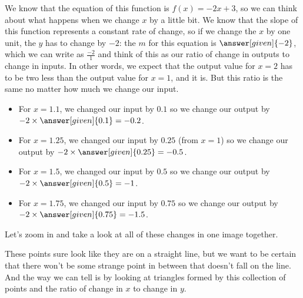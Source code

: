 \documentclass{ximera}
\begin{document}
\begin{example}
We know that the equation of this function is $f(x) = -2x+3$, so we can think about what happens when we change $x$ by a little bit. We know that the slope of this function represents a constant rate of change, so if we change the $x$ by one unit, the $y$ has to change by $-2$: the $m$ for this equation is $\answer[given]{-2}$, which we can write as $\frac{-2}{1}$ and think of this as our ratio of change in outputs to change in inputs. In other words, we expect that the output value for $x=2$ has to be two less than the output value for $x=1$, and it is. But this ratio is the same no matter how much we change our input.
\begin{itemize}
\item For $x=1.1$, we changed our input by $0.1$ so we change our output by $-2 \times \answer[given]{0.1} = -0.2$.
\item For $x=1.25$, we changed our input by $0.25$ (from $x=1$) so we change our output by $-2 \times \answer[given]{0.25} = -0.5$.
\item For $x=1.5$, we changed our input by $0.5$ so we change our output by $-2 \times \answer[given]{0.5} = -1$.
\item For $x=1.75$, we changed our input by $0.75$ so we change our output by $-2 \times \answer[given]{0.75} = -1.5$.
\end{itemize} 
Let's zoom in and take a look at all of these changes in one image together.
\begin{image}
\end{image}
These points sure look like they are on a straight line, but we want to be certain that there won't be some strange point in between that doesn't fall on the line. And the way we can tell is by looking at triangles formed by this collection of points and the ratio of change in $x$ to change in $y$.
\begin{image}
\end{image}
\end{example}
\end{document}
